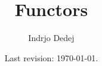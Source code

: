 




\title{Functors}
\author{Indrjo Dedej}
\date{Last revision: \today{}.}



\maketitle

\tableofcontents

%






